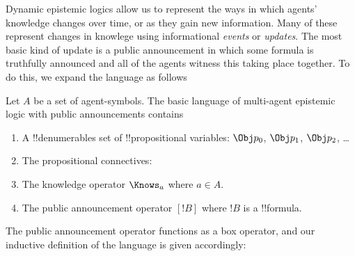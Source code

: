 \documentclass[../../../include/open-logic-section]{subfiles}
\begin{document}


Dynamic epistemic logics allow us to represent the ways in which
agents' knowledge changes over time, or as they gain new information.
Many of these represent changes in knowlege using informational
\emph{events} or \emph{updates}. The most basic kind of update is a
public announcement in which some formula is truthfully announced and
all of the agents witness this taking place together. To do this, we
expand the language as follows

\begin{defn}
Let $A$ be a set of agent-symbols. The basic language of multi-agent
epistemic logic with public announcements contains
\begin{enumerate}
  \item A !!{denumerable}s set of !!{propositional variable}s: $\Obj
    p_0$, $\Obj p_1$, $\Obj p_2$, \dots
  \item The propositional connectives: \startycommalist
  \item The knowledge operator $\Knows_a$ where $a \in A$.
  \item The public announcement operator $[!B]$ where $!B$ is a !!{formula}.
\end{enumerate}
\end{defn}

The public announcement operator functions as a box operator, and our
inductive definition of the language is given accordingly:
\end{document}
